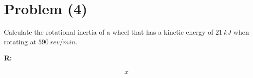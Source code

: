 \section{Problem (4)}

	Calculate the rotational inertia of a wheel that has a kinetic energy of $21 \ kJ$ when rotating at $590 \ rev/min$.

	\textbf{R:}

	\begin{align}
		x
	\end{align}
